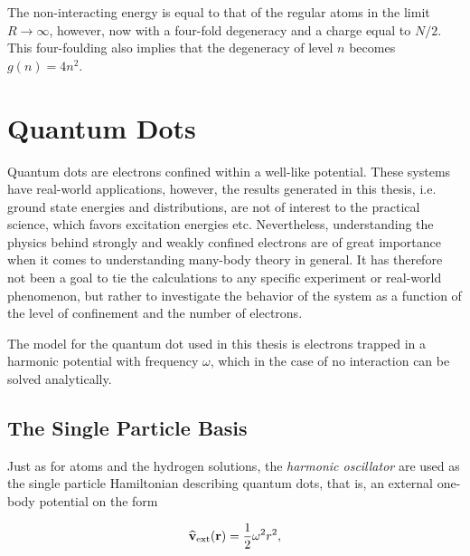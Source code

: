 The non-interacting energy is equal to that of the regular atoms in the limit $R\to\infty$, however, now with a four-fold degeneracy and a charge equal to $N/2$. This four-foulding also implies that the degeneracy of level $n$ becomes $g(n) = 4n^2$.

\section{Quantum Dots}

Quantum dots are electrons confined within a well-like potential. These systems have real-world applications, however, the results generated in this thesis, i.e. ground state energies and distributions, are not of interest to the practical science, which favors excitation energies etc. Nevertheless, understanding the physics behind strongly and weakly confined electrons are of great importance when it comes to understanding many-body theory in general. It has therefore not been a goal to tie the calculations to any specific experiment or real-world phenomenon, but rather to investigate the behavior of the system as a function of the level of confinement and the number of electrons.

The model for the quantum dot used in this thesis is electrons trapped in a harmonic potential with frequency $\omega$, which in the case of no interaction can be solved analytically. 

\subsection{The Single Particle Basis}

Just as for atoms and the hydrogen solutions, the \textit{harmonic oscillator} are used as the single particle Hamiltonian describing quantum dots, that is, an external one-body potential on the form 

\begin{equation}
 {\bf\widehat{v}}_\mathrm{ext}(\mathbf{r)} = \frac{1}{2}\omega^2r^2,
\end{equation}


